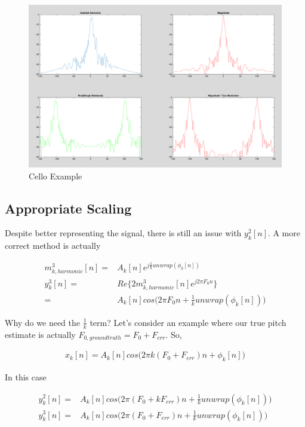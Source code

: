 \documentclass [11pt, proquest,oneside] {uwthesis}[2015/03/03]
\begin{document}
\begin{figure}[!ht]
  \centering
    \includegraphics[width=1\textwidth]{real_vs_magnitude_example}   
    \caption{Cello Example}
    \label{fig:real_vs_magnitude_example}
\end{figure}

\subsection{Appropriate Scaling}

Despite better representing the signal, there is still an issue with $y_k^2[n]$.  A more correct method is actually

\begin{align}
\label{eq:realVSmag3}
m^3_{k,harmonic}[n] =& A_k[n]e^{j\frac{1}{k} unwrap(\phi_k[n])} \\
y_k^3[n] =& Re\{ 2 m^3_{k,harmonic}[n] e^{j2\pi F_0 n} \}  \\
=& A_k[n]cos\Big(2\pi F_0 n + \frac{1}{k}unwrap(\phi_k[n])\Big) \nonumber
\end{align}


Why do we need the $\frac{1}{k}$ term?  Let's consider an example where our true pitch estimate is actually $F_{0,ground truth} = F_0 + F_{err}$.  So,

\begin{align}
x_k[n] = A_k[n]cos\Big(2\pi k(F_0 + F_{err})n + \phi_k[n]\Big)
\end{align}

In this case

\begin{align}
y_k^2[n] =& A_k[n]cos\Big(2\pi (F_0 + kF_{err})n + \frac{1}{k}unwrap(\phi_k[n])\Big) \\
y_k^3[n] =& A_k[n]cos\Big(2\pi (F_0 + F_{err})n + \frac{1}{k}unwrap(\phi_k[n])\Big)
\end{align}
\end{document}
